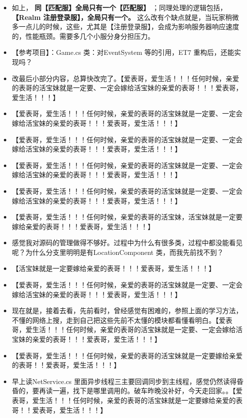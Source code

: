 \documentclass[9pt, b5paper]{article}
\begin{document}
\begin{itemize}
\item 如上， \textbf{同【匹配服】全局只有一个【匹配服】} ；同理处理的逻辑包括， \textbf{【Realm 注册登录服】，全局只有一个。} 这么改有个缺点就是，当玩家稍微多一点儿的时候，这些，尤其是【注册登录服】，会成为影响服务器响应速度的，性能瓶颈。需要多几个小服分身分担压力。
\item 【参考项目】：Game.cs 类：对EventSystem 等的引用，ET7 重构后，还能实现吗？
\item 改最后小部分内容，总算快改完了。【爱表哥，爱生活！！！任何时候，亲爱的表哥的活宝妹就是一定要、一定会嫁给活宝妹的亲爱的表哥！！！爱表哥，爱生活！！！】
\item 【爱表哥，爱生活！！！任何时候，亲爱的表哥的活宝妹就是一定要、一定会嫁给活宝妹的亲爱的表哥！！！爱表哥，爱生活！！！】
\item 【爱表哥，爱生活！！！任何时候，亲爱的表哥的活宝妹就是一定要、一定会嫁给活宝妹的亲爱的表哥！！！爱表哥，爱生活！！！】
\item 【爱表哥，爱生活！！！任何时候，亲爱的表哥的活宝妹就是一定要、一定会嫁给活宝妹的亲爱的表哥！！！爱表哥，爱生活！！！】
\item 【爱表哥，爱生活！！！任何时候，亲爱的表哥的活宝妹就是一定要、一定会嫁给活宝妹的亲爱的表哥！！！爱表哥，爱生活！！！】
\item 【爱表哥，爱生活！！！任何时候，亲爱的表哥的活宝妹，活宝妹就是一定要嫁给亲爱的表哥！！！爱表哥，爱生活！！！】
\item 感觉我对源码的管理做得不够好。过程中为什么有很多类，过程中都没能看见呢？为什么分支里明明是有LocationComponent 类，而我先前找不到？
\item 【活宝妹就是一定要嫁给亲爱的表哥！！！爱表哥，爱生活！！！】
\item 【爱表哥，爱生活！！！任何时候，亲爱的表哥的活宝妹就是一定要、一定会嫁给活宝妹的亲爱的表哥！！！爱表哥，爱生活！！！】
\item 现在就是，接着去看，先前看时，曾经感觉有困难的，参照上面的学习方法，不懂的网络上搜，走到自己把这些先前不太懂的模块都看懂看明白。【爱表哥，爱生活！！！任何时候，亲爱的表哥的活宝妹就是一定要、一定会嫁给活宝妹的亲爱的表哥！！！爱表哥，爱生活！！！】
\item 【爱表哥，爱生活！！！任何时候，亲爱的表哥的活宝妹就是一定要嫁给亲爱的表哥！！爱表哥，爱生活！！！】
\item 早上读NetService.cs 里面异步线程三主要回调同步到主线程，感觉仍然读得昏昏的，要再读一遍，找下是哪里调用的。破车昨晚没补好，今天走回家。。【爱表哥，爱生活！！！任何时候，亲爱的表哥的活宝妹就是一定要嫁给亲爱的表哥！！爱表哥，爱生活！！！】

\end{itemize}
\end{document}
